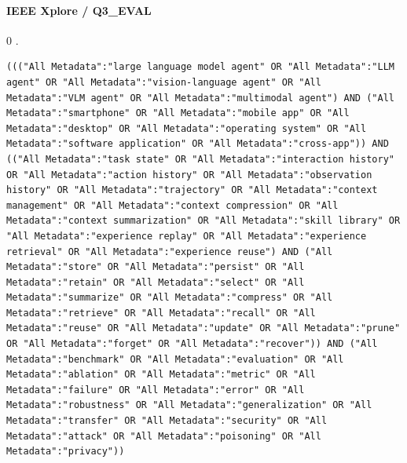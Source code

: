 \noindent\begin{minipage}{\linewidth}
\paragraph{IEEE Xplore / Q3\_EVAL}
0 .
\begin{lstlisting}
((("All Metadata":"large language model agent" OR "All Metadata":"LLM agent" OR "All Metadata":"vision-language agent" OR "All Metadata":"VLM agent" OR "All Metadata":"multimodal agent") AND ("All Metadata":"smartphone" OR "All Metadata":"mobile app" OR "All Metadata":"desktop" OR "All Metadata":"operating system" OR "All Metadata":"software application" OR "All Metadata":"cross-app")) AND (("All Metadata":"task state" OR "All Metadata":"interaction history" OR "All Metadata":"action history" OR "All Metadata":"observation history" OR "All Metadata":"trajectory" OR "All Metadata":"context management" OR "All Metadata":"context compression" OR "All Metadata":"context summarization" OR "All Metadata":"skill library" OR "All Metadata":"experience replay" OR "All Metadata":"experience retrieval" OR "All Metadata":"experience reuse") AND ("All Metadata":"store" OR "All Metadata":"persist" OR "All Metadata":"retain" OR "All Metadata":"select" OR "All Metadata":"summarize" OR "All Metadata":"compress" OR "All Metadata":"retrieve" OR "All Metadata":"recall" OR "All Metadata":"reuse" OR "All Metadata":"update" OR "All Metadata":"prune" OR "All Metadata":"forget" OR "All Metadata":"recover")) AND ("All Metadata":"benchmark" OR "All Metadata":"evaluation" OR "All Metadata":"ablation" OR "All Metadata":"metric" OR "All Metadata":"failure" OR "All Metadata":"error" OR "All Metadata":"robustness" OR "All Metadata":"generalization" OR "All Metadata":"transfer" OR "All Metadata":"security" OR "All Metadata":"attack" OR "All Metadata":"poisoning" OR "All Metadata":"privacy"))
\end{lstlisting}
\end{minipage}\par\medskip
